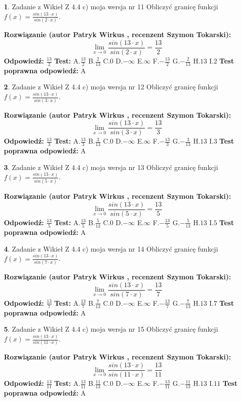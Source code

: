 \documentclass[12pt, a4paper]{article}
\theoremstyle{definition} %
\newtheorem{zad}{}
\newcommand{\zadStart}[1]{\begin{zad}#1\newline}
\newcommand{\zadStop}{\end{zad}}
\newcommand{\rozwStart}[2]{\noindent \textbf{Rozwiązanie (autor #1 , recenzent #2): }\newline}
\newcommand{\rozwStop}{\newline}
\newcommand{\odpStart}{\noindent \textbf{Odpowiedź:}\newline}
\newcommand{\odpStop}{\newline}
\newcommand{\testStart}{\noindent \textbf{Test:}\newline}
\newcommand{\testStop}{\newline}
\newcommand{\kluczStart}{\noindent \textbf{Test poprawna odpowiedź:}\newline}
\newcommand{\kluczStop}{\newline}
\begin{document}
\zadStart{Zadanie z Wikieł Z 4.4 c) moja wersja nr 11}
Obliczyć granicę funkcji $f(x)=\frac{sin(13\cdot x)}{sin(2\cdot x)}$.
\zadStop
\rozwStart{Patryk Wirkus}{Szymon Tokarski}
$$\lim\limits_{x\to 0}\frac{sin(13\cdot x)}{sin(2\cdot x)}=
\frac{13}{2}$$
\rozwStop
\odpStart
$\frac{13}{2}$
\odpStop
\testStart
A.$\frac{13}{2}$
B.$\frac{2}{13}$
C.$0$
D.$-\infty$
E.$\infty$
F.$-\frac{13}{2}$
G.$-\frac{2}{13}$
H.$13$
I.$2$
\testStop
\kluczStart
A
\kluczStop



\zadStart{Zadanie z Wikieł Z 4.4 c) moja wersja nr 12}
Obliczyć granicę funkcji $f(x)=\frac{sin(13\cdot x)}{sin(3\cdot x)}$.
\zadStop
\rozwStart{Patryk Wirkus}{Szymon Tokarski}
$$\lim\limits_{x\to 0}\frac{sin(13\cdot x)}{sin(3\cdot x)}=
\frac{13}{3}$$
\rozwStop
\odpStart
$\frac{13}{3}$
\odpStop
\testStart
A.$\frac{13}{3}$
B.$\frac{3}{13}$
C.$0$
D.$-\infty$
E.$\infty$
F.$-\frac{13}{3}$
G.$-\frac{3}{13}$
H.$13$
I.$3$
\testStop
\kluczStart
A
\kluczStop



\zadStart{Zadanie z Wikieł Z 4.4 c) moja wersja nr 13}
Obliczyć granicę funkcji $f(x)=\frac{sin(13\cdot x)}{sin(5\cdot x)}$.
\zadStop
\rozwStart{Patryk Wirkus}{Szymon Tokarski}
$$\lim\limits_{x\to 0}\frac{sin(13\cdot x)}{sin(5\cdot x)}=
\frac{13}{5}$$
\rozwStop
\odpStart
$\frac{13}{5}$
\odpStop
\testStart
A.$\frac{13}{5}$
B.$\frac{5}{13}$
C.$0$
D.$-\infty$
E.$\infty$
F.$-\frac{13}{5}$
G.$-\frac{5}{13}$
H.$13$
I.$5$
\testStop
\kluczStart
A
\kluczStop



\zadStart{Zadanie z Wikieł Z 4.4 c) moja wersja nr 14}
Obliczyć granicę funkcji $f(x)=\frac{sin(13\cdot x)}{sin(7\cdot x)}$.
\zadStop
\rozwStart{Patryk Wirkus}{Szymon Tokarski}
$$\lim\limits_{x\to 0}\frac{sin(13\cdot x)}{sin(7\cdot x)}=
\frac{13}{7}$$
\rozwStop
\odpStart
$\frac{13}{7}$
\odpStop
\testStart
A.$\frac{13}{7}$
B.$\frac{7}{13}$
C.$0$
D.$-\infty$
E.$\infty$
F.$-\frac{13}{7}$
G.$-\frac{7}{13}$
H.$13$
I.$7$
\testStop
\kluczStart
A
\kluczStop



\zadStart{Zadanie z Wikieł Z 4.4 c) moja wersja nr 15}
Obliczyć granicę funkcji $f(x)=\frac{sin(13\cdot x)}{sin(11\cdot x)}$.
\zadStop
\rozwStart{Patryk Wirkus}{Szymon Tokarski}
$$\lim\limits_{x\to 0}\frac{sin(13\cdot x)}{sin(11\cdot x)}=
\frac{13}{11}$$
\rozwStop
\odpStart
$\frac{13}{11}$
\odpStop
\testStart
A.$\frac{13}{11}$
B.$\frac{11}{13}$
C.$0$
D.$-\infty$
E.$\infty$
F.$-\frac{13}{11}$
G.$-\frac{11}{13}$
H.$13$
I.$11$
\testStop
\kluczStart
A
\kluczStop
\end{document}
